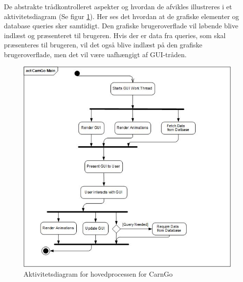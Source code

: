 \documentclass[Rapport/Rapport_main.tex]{subfiles}
\begin{document}
\noindent De abstrakte trådkontrolleret aspekter og hvordan de afvikles illustreres i et aktivitetsdiagram (Se figur \ref{fig:activity}). Her ses det hvordan at de grafiske elementer og database queries sker samtidigt. Den grafiske brugeroverflade vil løbende blive indlæst og præsenteret til brugeren. Hvis der er data fra queries, som skal præsenteres til brugeren, vil det også blive indlæst på den grafiske brugeroverflade, men det vil være uafhængigt af GUI-tråden.
\begin{figure}[H]
    \centering
    \includegraphics[width=1\textwidth]{Arkitektur/4+1View/Graphics/ActivityDiagram_Process.jpg}
    \caption{Aktivitetsdiagram for hovedprocessen for CarnGo}
    \label{fig:activity}
\end{figure}
\end{document}
